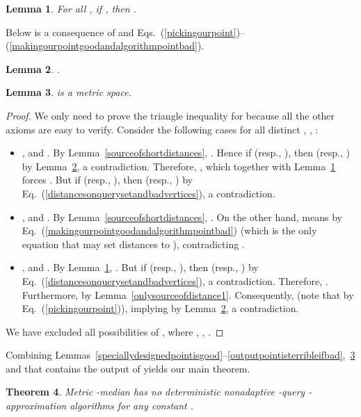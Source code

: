 \documentclass[letterpaper,12pt]{article}
\newtheorem{theorem}{Theorem}
\newtheorem{lemma}[theorem]{Lemma}
\begin{document}
{\begin{lemma}\label{onlybadandalgorithmoutputcanhavedistance4}
For all  , if , then .
\end{lemma}


Below is a consequence of  and
Eqs.~(\ref{pickingourpoint})--(\ref{makingourpointgoodandalgorithmpointbad}).

\begin{lemma}\label{distancebetweennonbadoutputandourdesignedpoint}
.
\end{lemma}

\begin{lemma}\label{constructeddistanceismetric}
 is a metric space.
\end{lemma}
\begin{proof}
We only need to prove the triangle inequality for  because all the other
axioms
are easy to verify.
Consider
the following cases for all distinct , , :
\begin{itemize}
\item ,  and .
By Lemma~\ref{sourceofshortdistances},
.
Hence if  (resp., ), then  (resp., )
by
Lemma~\ref{distancebetweennonbadoutputandourdesignedpoint},
a
contradiction.
Therefore, , which together with
Lemma~\ref{onlybadandalgorithmoutputcanhavedistance4} forces .
But
if
 (resp., ), then
 (resp., )
by Eq.~(\ref{distancesonquerysetandbadvertices}), a contradiction.
\item ,  and .
By Lemma~\ref{sourceofshortdistances},
.
On the other hand,  means  by
Eq.~(\ref{makingourpointgoodandalgorithmpointbad}) (which is the only
equation that may set distances to ),
contradicting .
\item ,  and .
By Lemma~\ref{onlybadandalgorithmoutputcanhavedistance4},
.
But if  (resp., ), then  (resp., ) by
Eq.~(\ref{distancesonquerysetandbadvertices}), a contradiction.
Therefore, .
Furthermore,  by Lemma~\ref{onlysourceofdistance1}.
Consequently, 
(note that  by Eq.~(\ref{pickingourpoint})),
implying 
by
Lemma~\ref{distancebetweennonbadoutputandourdesignedpoint},
a contradiction.
\end{itemize}
We have excluded all possibilities of , where
, , .
\end{proof}


Combining
Lemmas~\ref{speciallydesignedpointisgood}--\ref{outputpointisterribleifbad},~\ref{constructeddistanceismetric}
and that
 contains the output of 
yields our main theorem.

\begin{theorem}\label{maintheorem}
{\sc Metric -median} has no deterministic nonadaptive -query
-approximation
algorithms
for any constant .
\end{theorem}



}
\end{document}
